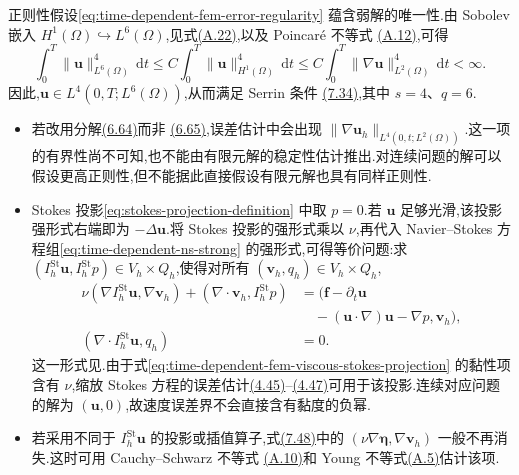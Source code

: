 \begin{note}[定理 7.35 的正则性假设]
\label{note:time-dependent-fem-error-regularity-uniqueness}
正则性假设\cref{eq:time-dependent-fem-error-regularity} 蕴含弱解的唯一性.由 Sobolev 嵌入
$H^1(\Omega)\hookrightarrow L^6(\Omega)$,见式\hyperref[eq:appendix-a-22]{(A.22)},以及 Poincaré 不等式
\hyperref[eq:appendix-a-12]{(A.12)},可得
\[
  \int_0^T\|\bm{u}\|_{L^6(\Omega)}^4\,\mathrm{d}t
  \le C\int_0^T\|\bm{u}\|_{H^1(\Omega)}^4\,\mathrm{d}t
  \le C\int_0^T\|\nabla\bm{u}\|_{L^2(\Omega)}^4\,\mathrm{d}t
  <\infty.
\]
因此,$\bm{u}\in L^4(0,T;L^6(\Omega))$,从而满足 Serrin 条件
\hyperref[eq:time-dependent-serrin-condition]{(7.34)},其中 $s=4$、$q=6$.
\end{note}

\begin{note}[定理 7.35 的证明]
\label{note:time-dependent-fem-error-proof}
\begin{itemize}
  \item 若改用分解\hyperref[eq:steady-ns-error-convection-splitting]{(6.64)}而非
  \hyperref[eq:steady-ns-error-convection-splitting-alt]{(6.65)},误差估计中会出现
  $\|\nabla\bm{u}_h\|_{L^4(0,t;L^2(\Omega))}$.这一项的有界性尚不可知,也不能由有限元解的稳定性估计推出.对连续问题的解可以假设更高正则性,但不能据此直接假设有限元解也具有同样正则性.
  \item Stokes 投影\cref{eq:stokes-projection-definition} 中取 $p=0$.若 $\bm{u}$ 足够光滑,该投影强形式右端即为 $-\Delta\bm{u}$.将 Stokes 投影的强形式乘以 $\nu$,再代入 Navier--Stokes 方程组\cref{eq:time-dependent-ns-strong} 的强形式,可得等价问题:求
  $(I_h^{\mathrm{St}}\bm{u},I_h^{\mathrm{St}}p)\in V_h\times Q_h$,使得对所有
  $(\bm{v}_h,q_h)\in V_h\times Q_h$,
  \begin{equation}\label{eq:time-dependent-fem-viscous-stokes-projection}
  \begin{aligned}
    \nu(\nabla I_h^{\mathrm{St}}\bm{u},\nabla\bm{v}_h)
      +(\nabla\cdot\bm{v}_h,I_h^{\mathrm{St}}p)
      &=(\bm{f}-\partial_t\bm{u}\\
      &\quad-(\bm{u}\cdot\nabla)\bm{u}
          -\nabla p,\bm{v}_h),\\
    (\nabla\cdot I_h^{\mathrm{St}}\bm{u},q_h)&=0.
  \end{aligned}
  \end{equation}
  这一形式见\textcite{deFrutos2016b}.由于式\cref{eq:time-dependent-fem-viscous-stokes-projection} 的黏性项含有 $\nu$,缩放 Stokes 方程的误差估计\hyperref[eq:stokes-scaled-error-h1]{(4.45)}–\hyperref[eq:stokes-scaled-error-pressure]{(4.47)}可用于该投影.连续对应问题的解为 $(\bm{u},0)$,故速度误差界不会直接含有黏度的负幂.
  \item 若采用不同于 $I_h^{\mathrm{St}}\bm{u}$ 的投影或插值算子,式\hyperref[eq:time-dependent-fem-error-equation]{(7.48)}中的
  $(\nu\nabla\symbf{\eta},\nabla\bm{v}_h)$ 一般不再消失.这时可用 Cauchy--Schwarz 不等式
  \hyperref[eq:appendix-a-10]{(A.10)}和 Young 不等式\hyperref[eq:appendix-a-5]{(A.5)}估计该项.
\end{itemize}
\end{note}

